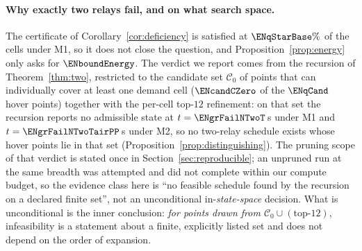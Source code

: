 \documentclass[11pt]{article}
\theoremstyle{dshplain}
\theoremstyle{dshdefn}
\begin{document}
\paragraph{Why exactly two relays fail, and on what search space.}
The certificate of Corollary~\ref{cor:deficiency} is satisfied at
$\ENqStarBase\%$ of the cells under M1, so it does not close the question, and
Proposition~\ref{prop:energy} only asks for $\ENboundEnergy$. The verdict we
report comes from the recursion of Theorem~\ref{thm:two}, restricted to the
candidate set $\mathcal{C}_0$ of points that can individually cover at least one
demand cell ($\ENcandCZero$ of the $\ENqCand$ hover points) together with the
per-cell top-$12$ refinement: on that set the recursion reports no admissible
state at $t=\ENgrFailNTwoT$\,s under M1 and $t=\ENgrFailNTwoTairPP$\,s under M2, so
no two-relay schedule exists whose hover points lie in that set
(Proposition~\ref{prop:distinguishing}). The pruning scope of that verdict is stated
once in Section~\ref{sec:reproducible}; an unpruned run at the same
breadth was attempted and did not complete within our compute
budget, so the evidence class here is ``no feasible schedule found by the
recursion on a declared finite set'', not an unconditional in-\emph{state-space}
decision. What is unconditional is the inner conclusion: \emph{for points drawn
from $\mathcal{C}_0\cup(\text{top-}12)$}, infeasibility is a statement about a
finite, explicitly listed set and does not depend on the order of expansion.
\end{document}
